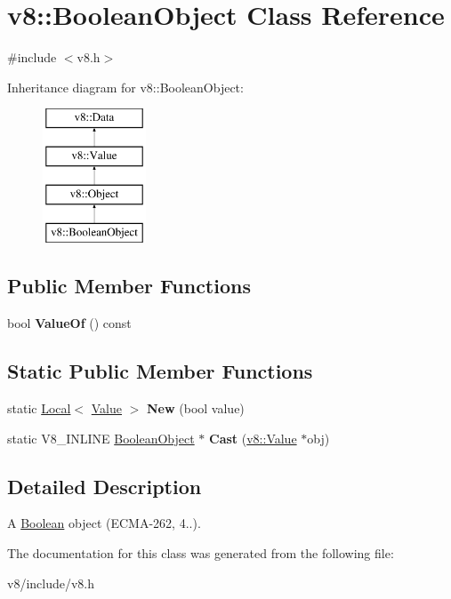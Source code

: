 \hypertarget{classv8_1_1BooleanObject}{\section{v8\-:\-:Boolean\-Object Class Reference}
\label{classv8_1_1BooleanObject}
}


{\ttfamily \#include $<$v8.\-h$>$}

Inheritance diagram for v8\-:\-:Boolean\-Object\-:\begin{figure}[H]
\begin{center}
\leavevmode
\includegraphics[height=4.000000cm]{classv8_1_1BooleanObject}
\end{center}
\end{figure}
\subsection*{Public Member Functions}
\begin{DoxyCompactItemize}
\item 
\hypertarget{classv8_1_1BooleanObject_a283419656e641bcd9588dee56c0a0686}{bool {\bfseries Value\-Of} () const }\label{classv8_1_1BooleanObject_a283419656e641bcd9588dee56c0a0686}

\end{DoxyCompactItemize}
\subsection*{Static Public Member Functions}
\begin{DoxyCompactItemize}
\item 
\hypertarget{classv8_1_1BooleanObject_af57ca9198a6c6d00617da80b3f705e37}{static \hyperlink{classv8_1_1Local}{Local}$<$ \hyperlink{classv8_1_1Value}{Value} $>$ {\bfseries New} (bool value)}\label{classv8_1_1BooleanObject_af57ca9198a6c6d00617da80b3f705e37}

\item 
\hypertarget{classv8_1_1BooleanObject_ac701398c9b1c74fbce31d66106c9a87f}{static V8\-\_\-\-I\-N\-L\-I\-N\-E \hyperlink{classv8_1_1BooleanObject}{Boolean\-Object} $\ast$ {\bfseries Cast} (\hyperlink{classv8_1_1Value}{v8\-::\-Value} $\ast$obj)}\label{classv8_1_1BooleanObject_ac701398c9b1c74fbce31d66106c9a87f}

\end{DoxyCompactItemize}


\subsection{Detailed Description}
A \hyperlink{classv8_1_1Boolean}{Boolean} object (E\-C\-M\-A-\/262, 4..). 

The documentation for this class was generated from the following file\-:\begin{DoxyCompactItemize}
\item 
v8/include/v8.\-h\end{DoxyCompactItemize}
